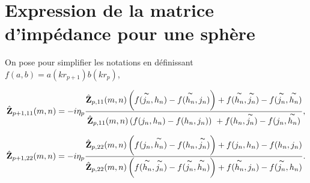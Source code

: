 \section{Expression de la matrice d'impédance pour une sphère}
\label{sec:annex:imp_sphere}



On pose pour simplifier les notations en définissant \(f(a,b)=a(kr_{p+1})b(kr_p)\),

\begin{equation}
      \hat{\mathbf{Z}}_{p+1,11}(m,n) = -i\eta_p
        \dfrac{\hat{\mathbf{Z}}_{p,11}(m,n) \left( f(\overset{\thicksim}{j_n},h_n) - f(\overset{\thicksim}{h_n},j_n) \right) + f(\overset{\thicksim}{h_n},\overset{\thicksim}{j_n}) - f(\overset{\thicksim}{j_n},\overset{\thicksim}{h_n})}{\hat{\mathbf{Z}}_{p,11}(m,n) \left( f(j_n,h_n) - f(h_n,j_n) \right) \\ + f(h_n,\overset{\thicksim}{j_n}) - f(j_n,\overset{\thicksim}{h_n})},
\end{equation}

\begin{equation}
      \hat{\mathbf{Z}}_{p+1,22}(m,n) = -i\eta_p
      \dfrac{\hat{\mathbf{Z}}_{p,22}(m,n) \left( f(j_n,\overset{\thicksim}{h_n}) - f(h_n,\overset{\thicksim}{j_n}) \right) + f(j_n,h_n) - f(h_n,j_n) }{\hat{\mathbf{Z}}_{p,22}(m,n) \left( f(\overset{\thicksim}{h_n},\overset{\thicksim}{j_n}) - f(\overset{\thicksim}{j_n},\overset{\thicksim}{h_n}) \right) + f(\overset{\thicksim}{h_n},j_n) - f(\overset{\thicksim}{j_n},h_n)}.
\end{equation}